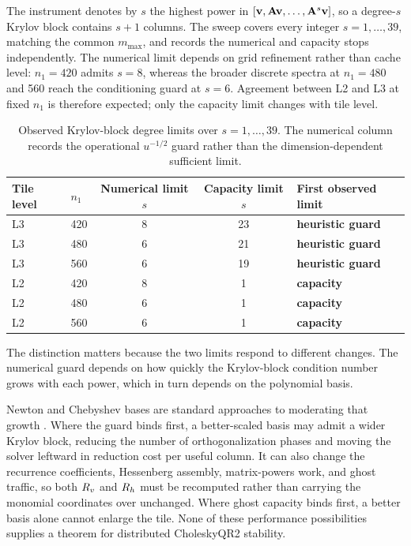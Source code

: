 The instrument denotes by $s$ the highest power in $[\mathbf{v},\mathbf{A}\mathbf{v},\ldots,\mathbf{A}^s\mathbf{v}]$, so a degree-$s$ Krylov block contains $s+1$ columns. The sweep covers every integer $s=1,\ldots,39$, matching the common $m_{\max}$, and records the numerical and capacity stops independently. The numerical limit depends on grid refinement rather than cache level: $n_1=420$ admits $s=8$, whereas the broader discrete spectra at $n_1=480$ and 560 reach the conditioning guard at $s=6$. Agreement between L2 and L3 at fixed $n_1$ is therefore expected; only the capacity limit changes with tile level.
\begin{table}[htbp!]
\centering
\captionsetup{width=0.9\textwidth}
\caption{Observed Krylov-block degree limits over $s=1,\ldots,39$. The numerical column records the operational $u^{-1/2}$ guard rather than the dimension-dependent sufficient limit.}
\label{tab:swidth}
\begin{tabular}{@{}llccl@{}}
\toprule
\textbf{Tile level} & $n_1$ & \textbf{Numerical limit $s$} & \textbf{Capacity limit $s$} & \textbf{First observed limit} \\
\midrule
L3 & 420      & 8 & 23 & \textbf{heuristic guard} \\
L3 & 480      & 6 & 21 & \textbf{heuristic guard} \\
L3 & 560      & 6 & 19 & \textbf{heuristic guard} \\
L2 & 420      & 8 & 1  & \textbf{capacity} \\
L2 & 480      & 6 & 1  & \textbf{capacity} \\
L2 & 560      & 6 & 1  & \textbf{capacity} \\
\bottomrule
\end{tabular}
\end{table}

The distinction matters because the two limits respond to different changes. The numerical guard depends on how quickly the Krylov-block condition number grows with each power, which in turn depends on the polynomial basis.

Newton and Chebyshev bases are standard approaches to moderating that growth \cite{bai-hu-reichel-1994,hoemmen-2010,carson-2015}. Where the guard binds first, a better-scaled basis may admit a wider Krylov block, reducing the number of orthogonalization phases and moving the solver leftward in reduction cost per useful column. It can also change the recurrence coefficients, Hessenberg assembly, matrix-powers work, and ghost traffic, so both $R_v$ and $R_h$ must be recomputed rather than carrying the monomial coordinates over unchanged. Where ghost capacity binds first, a better basis alone cannot enlarge the tile. None of these performance possibilities supplies a theorem for distributed CholeskyQR2 stability.


